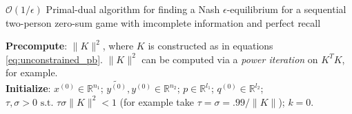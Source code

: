 \documentclass[12pt]{article}
\begin{document}

\begin{algorithm}[G_2]
  \caption{$\mathcal{O}(1/\epsilon)$ Primal-dual algorithm for finding a Nash $\epsilon$-equilibrium for a sequential two-person zero-sum game with imcomplete information and perfect recall}
  \textbf{Precompute}: $\|K\|^2$, where $K$ is constructed as in equations \eqref{eq:unconstrained_pb}. $\|K\|^2$ can be computed via a \textit{power iteration} on $K^TK$, for example.\\
  \textbf{Initialize}:
  $x^{(0)} \in \mathbb{R}^{n_1}$; $\tilde{y^{(0)}}, y^{(0)} \in \mathbb{R}^{n_2}$; $p \in \mathbb{R}^{l_1}$; $q^{(0)} \in \mathbb{R}^{l_2}$; 
  $\tau, \sigma > 0 \text{ s.t. }\tau\sigma \|K\|^2 < 1$ (for example take $\tau = \sigma = .99/\|K\|$); $k = 0$.\\
  \label{Tab:algo_simplified}
\end{algorithm}
\end{document}

